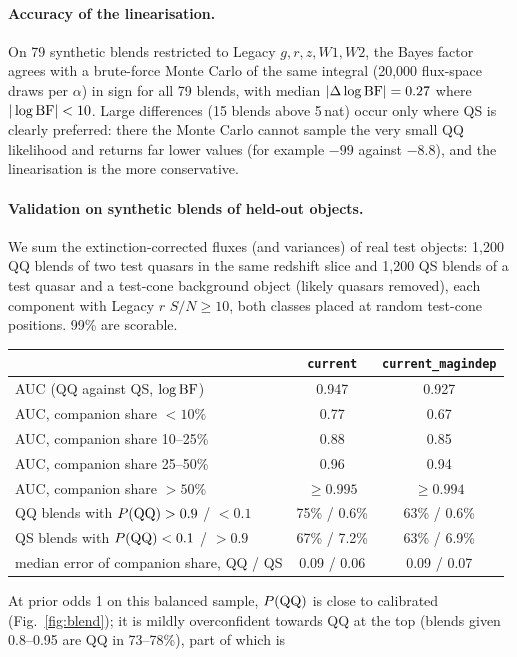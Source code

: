 \documentclass[11pt,a4paper]{article}
\newcommand{\code}[1]{\texttt{#1}}
\begin{document}
\paragraph{Accuracy of the linearisation.} On 79 synthetic blends restricted to Legacy $g,r,z,W1,W2$, the
Bayes factor agrees with a brute-force Monte Carlo of the same integral (20,000 flux-space draws per
$\alpha$) in sign for all 79 blends, with median $|\Delta\log{\rm BF}|=0.27$ where $|\log{\rm BF}|<10$. Large
differences (15 blends above 5\,nat) occur only where QS is clearly preferred: there the Monte Carlo cannot
sample the very small QQ likelihood and returns far lower values (for example $-99$ against $-8.8$), and the
linearisation is the more conservative.

\paragraph{Validation on synthetic blends of held-out objects.} We sum the extinction-corrected fluxes (and
variances) of real test objects: 1,200 QQ blends of two test quasars in the same redshift slice and 1,200
QS blends of a test quasar and a test-cone background object (likely quasars removed), each component with
Legacy $r$ $S/N\ge10$, both classes placed at random test-cone positions. 99\% are scorable.
\begin{center}\small
\begin{tabular}{lcc}
\toprule
& \code{current} & \code{current\_magindep} \\
\midrule
AUC (QQ against QS, $\log{\rm BF}$) & 0.947 & 0.927 \\
AUC, companion share $<10\%$ & 0.77 & 0.67 \\
AUC, companion share 10--25\% & 0.88 & 0.85 \\
AUC, companion share 25--50\% & 0.96 & 0.94 \\
AUC, companion share $>50\%$ & $\ge0.995$ & $\ge0.994$ \\
QQ blends with $P({\rm QQ})>0.9$ / $<0.1$ & 75\% / 0.6\% & 63\% / 0.6\% \\
QS blends with $P({\rm QQ})<0.1$ / $>0.9$ & 67\% / 7.2\% & 63\% / 6.9\% \\
median error of companion share, QQ / QS & 0.09 / 0.06 & 0.09 / 0.07 \\
\bottomrule
\end{tabular}
\end{center}
At prior odds 1 on this balanced sample, $P({\rm QQ})$ is close to calibrated (Fig.~\ref{fig:blend}); it is
mildly overconfident towards QQ at the top (blends given 0.8--0.95 are QQ in 73--78\%), part of which is
\end{document}
